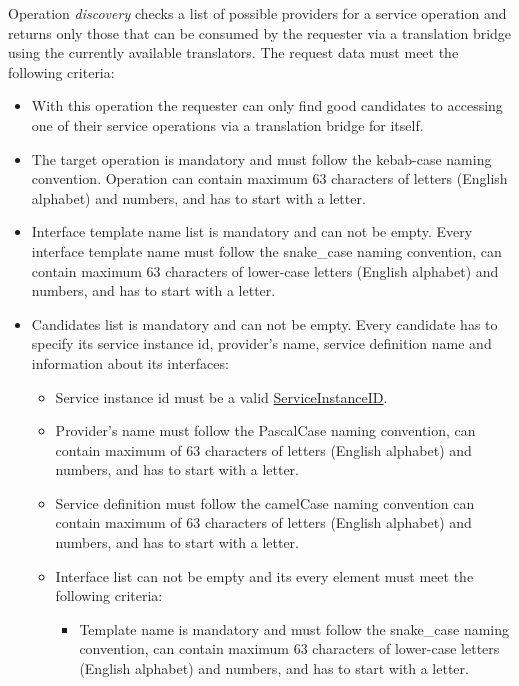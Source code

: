 \documentclass[a4paper]{arrowhead}
\newcommand{\pref}[1]{{\textcolor{ArrowheadGrey}{\hyperref[sec:model:primitives:#1]{#1}}}}
\begin{document}
{}

Operation \textit{discovery} checks a list of possible providers for a service operation and returns only those that can be consumed by the requester via a translation bridge using the currently available translators. The request data must meet the following criteria:

\begin{itemize}
    \item With this operation the requester can only find good candidates to accessing one of their service operations via a translation bridge for itself. 
    \item The target operation is mandatory and must follow the kebab-case naming convention. Operation can contain maximum 63 characters of letters (English alphabet) and numbers, and has to start with a letter.
    \item Interface template name list is mandatory and can not be empty. Every interface template name must follow the snake\_case naming convention, can contain maximum 63 characters of lower-case letters (English alphabet) and numbers, and has to start with a letter.
    \item Candidates list is mandatory and can not be empty. Every candidate has to specify its service instance id, provider's name, service definition name and information about its interfaces:
    \begin{itemize}
        \item Service instance id must be a valid \pref{ServiceInstanceID}.
        \item Provider's name must follow the PascalCase naming convention, can contain maximum of 63 characters of letters (English alphabet) and numbers, and has to start with a letter.
        \item Service definition must follow the camelCase naming convention can contain maximum of 63 characters of letters (English alphabet) and numbers, and has to start with a letter.
        \item Interface list can not be empty and its every element must meet the following criteria:
        \begin{itemize}
            \item Template name is mandatory and must follow the snake\_case naming convention, can contain maximum 63 characters of lower-case letters (English alphabet) and numbers, and has to start with a letter.

\end{itemize}
\end{itemize}
\end{itemize}
\end{document}
